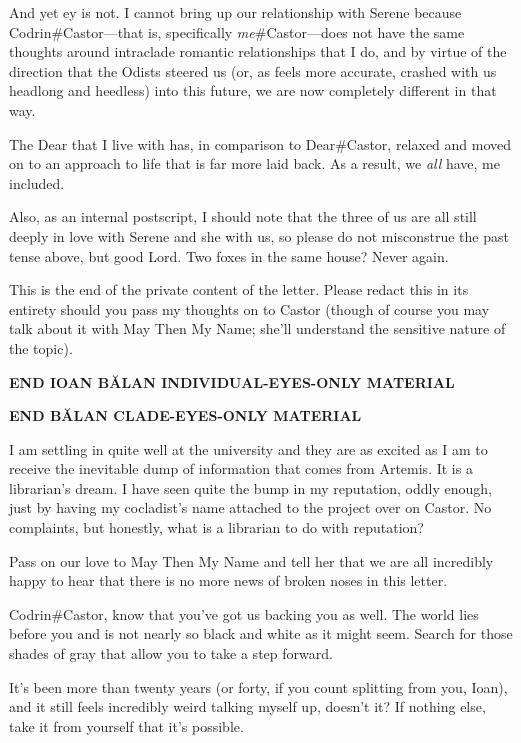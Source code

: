 And yet ey is not. I cannot bring up our relationship with Serene because Codrin\#Castor—that is, specifically \emph{me}\#Castor—does not have the same thoughts around intraclade romantic relationships that I do, and by virtue of the direction that the Odists steered us (or, as feels more accurate, crashed with us headlong and heedless) into this future, we are now completely different in that way.

The Dear that I live with has, in comparison to Dear\#Castor, relaxed and moved on to an approach to life that is far more laid back. As a result, we \emph{all} have, me included.

Also, as an internal postscript, I should note that the three of us are all still deeply in love with Serene and she with us, so please do not misconstrue the past tense above, but good Lord. Two foxes in the same house? Never again.

This is the end of the private content of the letter. Please redact this in its entirety should you pass my thoughts on to Castor (though of course you may talk about it with May Then My Name; she'll understand the sensitive nature of the topic).

\begin{center}
\textbf{END IOAN BĂLAN INDIVIDUAL-EYES-ONLY MATERIAL}
\end{center}

\begin{center}
\textbf{END BĂLAN CLADE-EYES-ONLY MATERIAL}
\end{center}

\noindent I am settling in quite well at the university and they are as excited as I am to receive the inevitable dump of information that comes from Artemis. It is a librarian's dream. I have seen quite the bump in my reputation, oddly enough, just by having my cocladist's name attached to the project over on Castor. No complaints, but honestly, what is a librarian to do with reputation?

Pass on our love to May Then My Name and tell her that we are all incredibly happy to hear that there is no more news of broken noses in this letter.

Codrin\#Castor, know that you've got us backing you as well. The world lies before you and is not nearly so black and white as it might seem. Search for those shades of gray that allow you to take a step forward.

It's been more than twenty years (or forty, if you count splitting from you, Ioan), and it still feels incredibly weird talking myself up, doesn't it? If nothing else, take it from yourself that it's possible.

